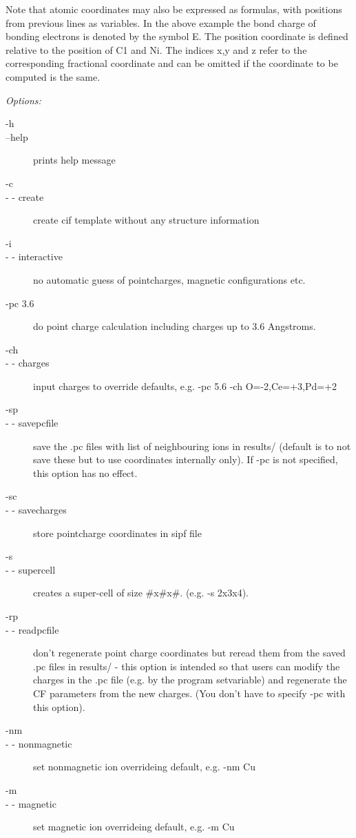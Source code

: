 \begin{description}
Note that atomic coordinates may also be expressed as formulas, with positions
from previous lines as variables. In the above example the bond charge of bonding 
electrons is denoted by the symbol E. The position coordinate is defined relative
to the position of C1 and Ni. The indices x,y and z refer to the corresponding
fractional coordinate and can be omitted if the coordinate to be computed
is the same.

{\em Options:}
\begin{description}
\item[ -h ]
 \item[--help] prints help message
 \item[-c]
\item[- - create]  create cif template without any structure information
\item[-i]
\item[- - interactive] no automatic guess of pointcharges, magnetic configurations etc. 
\item[-pc 3.6] do point charge calculation including charges up to 3.6 Angstroms.
\item[-ch]
\item[- - charges] input charges to override defaults, e.g. -pc 5.6 -ch O=-2,Ce=+3,Pd=+2
\item[-sp       ] 
\item[- - savepcfile] save the .pc files with list of neighbouring ions in results/ (default is to not save these but to use coordinates internally only). If -pc is not specified, this option has no effect.
\item[-sc       ] 
\item[- - savecharges ]store pointcharge coordinates in sipf file
\item[-s       ] 
\item[- - supercell] creates a super-cell of size \#x\#x\#. (e.g. -s 2x3x4).
\item[-rp        ] 
\item[- - readpcfile] don't regenerate point charge coordinates but reread them from 
the saved .pc files in results/ - this option is intended so that users can 
modify the charges in the .pc file (e.g. by the program {\prg setvariable})
 and regenerate the CF parameters 
from the new charges. (You don't have to specify -pc with this option).
\item[-nm]\item[- - nonmagnetic]  set nonmagnetic ion overrideing default, e.g. -nm Cu
   \item[-m] \item[- - magnetic]  set magnetic ion overrideing default, e.g. -m Cu
    

\end{description}
\end{description}
